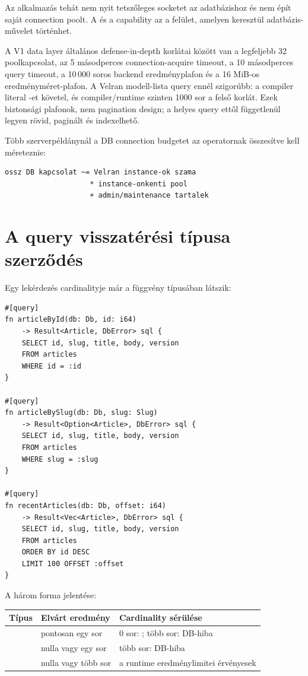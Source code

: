 Az alkalmazás tehát nem nyit tetszőleges socketet az adatbázishoz és nem épít saját connection poolt. A  és a  capability az a felület, amelyen keresztül adatbázis-művelet történhet.

A V1 data layer általános defense-in-depth korlátai között van a legfeljebb 32 poolkapcsolat, az 5 másodperces connection-acquire timeout, a 10 másodperces query timeout, a 10\,000 soros backend eredményplafon és a 16 MiB-os eredményméret-plafon. A Velran modell-lista query ennél szigorúbb: a compiler literal -et követel, és compiler/runtime szinten 1000 sor a felső korlát. Ezek biztonsági plafonok, nem pagination design; a helyes query ettől függetlenül legyen rövid, paginált és indexelhető.

Több szerverpéldánynál a DB connection budgetet az operatornak összesítve kell méreteznie:

\begin{lstlisting}
ossz DB kapcsolat ~= Velran instance-ok szama
                    * instance-onkenti pool
                    + admin/maintenance tartalek
\end{lstlisting}

\section{A query visszatérési típusa szerződés}

Egy lekérdezés cardinalityje már a függvény típusában látszik:

\begin{lstlisting}[language=Velran]
#[query]
fn articleById(db: Db, id: i64)
    -> Result<Article, DbError> sql {
    SELECT id, slug, title, body, version
    FROM articles
    WHERE id = :id
}

#[query]
fn articleBySlug(db: Db, slug: Slug)
    -> Result<Option<Article>, DbError> sql {
    SELECT id, slug, title, body, version
    FROM articles
    WHERE slug = :slug
}

#[query]
fn recentArticles(db: Db, offset: i64)
    -> Result<Vec<Article>, DbError> sql {
    SELECT id, slug, title, body, version
    FROM articles
    ORDER BY id DESC
    LIMIT 100 OFFSET :offset
}
\end{lstlisting}

A három forma jelentése:

\begin{center}
\begin{tabularx}{\textwidth}{@{}L{0.23\textwidth}YY@{}}
\toprule
Típus & Elvárt eredmény & Cardinality sérülése \\
\midrule
{} & pontosan egy sor & 0 sor: ; több sor: DB-hiba \\
 & nulla vagy egy sor & több sor: DB-hiba \\
 & nulla vagy több sor & a runtime eredménylimitei érvényesek \\
\bottomrule
\end{tabularx}
\end{center}

